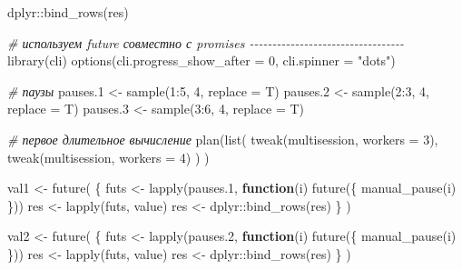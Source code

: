 \documentclass[
]{book}
\newenvironment{Shaded}{\begin{snugshade}}{\end{snugshade}}
\newcommand{\AttributeTok}[1]{\textcolor[rgb]{0.77,0.63,0.00}{#1}}
\newcommand{\CommentTok}[1]{\textcolor[rgb]{0.56,0.35,0.01}{\textit{#1}}}
\newcommand{\ControlFlowTok}[1]{\textcolor[rgb]{0.13,0.29,0.53}{\textbf{#1}}}
\newcommand{\DecValTok}[1]{\textcolor[rgb]{0.00,0.00,0.81}{#1}}
\newcommand{\FloatTok}[1]{\textcolor[rgb]{0.00,0.00,0.81}{#1}}
\newcommand{\FunctionTok}[1]{\textcolor[rgb]{0.00,0.00,0.00}{#1}}
\newcommand{\NormalTok}[1]{#1}
\newcommand{\OtherTok}[1]{\textcolor[rgb]{0.56,0.35,0.01}{#1}}
\newcommand{\SpecialCharTok}[1]{\textcolor[rgb]{0.00,0.00,0.00}{#1}}
\newcommand{\StringTok}[1]{\textcolor[rgb]{0.31,0.60,0.02}{#1}}
\begin{document}
\begin{Shaded}
\begin{Highlighting}[]
\NormalTok{dplyr}\SpecialCharTok{::}\FunctionTok{bind\_rows}\NormalTok{(res)}


\CommentTok{\# используем future совместно с promises {-}{-}{-}{-}{-}{-}{-}{-}{-}{-}{-}{-}{-}{-}{-}{-}{-}{-}{-}{-}{-}{-}{-}{-}{-}{-}{-}{-}{-}{-}{-}{-}{-}{-}}
\FunctionTok{library}\NormalTok{(cli)}
\FunctionTok{options}\NormalTok{(}\AttributeTok{cli.progress\_show\_after =} \DecValTok{0}\NormalTok{, }
        \AttributeTok{cli.spinner =} \StringTok{"dots"}\NormalTok{)}

\CommentTok{\# паузы}
\NormalTok{pauses}\FloatTok{.1} \OtherTok{\textless{}{-}} \FunctionTok{sample}\NormalTok{(}\DecValTok{1}\SpecialCharTok{:}\DecValTok{5}\NormalTok{, }\DecValTok{4}\NormalTok{, }\AttributeTok{replace =}\NormalTok{ T)}
\NormalTok{pauses}\FloatTok{.2} \OtherTok{\textless{}{-}} \FunctionTok{sample}\NormalTok{(}\DecValTok{2}\SpecialCharTok{:}\DecValTok{3}\NormalTok{, }\DecValTok{4}\NormalTok{, }\AttributeTok{replace =}\NormalTok{ T)}
\NormalTok{pauses}\FloatTok{.3} \OtherTok{\textless{}{-}} \FunctionTok{sample}\NormalTok{(}\DecValTok{3}\SpecialCharTok{:}\DecValTok{6}\NormalTok{, }\DecValTok{4}\NormalTok{, }\AttributeTok{replace =}\NormalTok{ T)}

\CommentTok{\# первое длительное вычисление}
\FunctionTok{plan}\NormalTok{(}\FunctionTok{list}\NormalTok{(}
  \FunctionTok{tweak}\NormalTok{(multisession, }\AttributeTok{workers =} \DecValTok{3}\NormalTok{), }
  \FunctionTok{tweak}\NormalTok{(multisession, }\AttributeTok{workers =} \DecValTok{4}\NormalTok{)}
\NormalTok{  )}
\NormalTok{)}

\NormalTok{val1 }\OtherTok{\textless{}{-}} \FunctionTok{future}\NormalTok{(}
\NormalTok{  \{}
\NormalTok{    futs }\OtherTok{\textless{}{-}} \FunctionTok{lapply}\NormalTok{(pauses}\FloatTok{.1}\NormalTok{, }\ControlFlowTok{function}\NormalTok{(i) }\FunctionTok{future}\NormalTok{(\{ }\FunctionTok{manual\_pause}\NormalTok{(i) \}))}
\NormalTok{    res  }\OtherTok{\textless{}{-}} \FunctionTok{lapply}\NormalTok{(futs, value) }
\NormalTok{    res  }\OtherTok{\textless{}{-}}\NormalTok{ dplyr}\SpecialCharTok{::}\FunctionTok{bind\_rows}\NormalTok{(res)}
\NormalTok{  \}}
\NormalTok{) }

\NormalTok{val2 }\OtherTok{\textless{}{-}} \FunctionTok{future}\NormalTok{(}
\NormalTok{  \{}
\NormalTok{    futs }\OtherTok{\textless{}{-}} \FunctionTok{lapply}\NormalTok{(pauses}\FloatTok{.2}\NormalTok{, }\ControlFlowTok{function}\NormalTok{(i) }\FunctionTok{future}\NormalTok{(\{ }\FunctionTok{manual\_pause}\NormalTok{(i) \}))}
\NormalTok{    res  }\OtherTok{\textless{}{-}} \FunctionTok{lapply}\NormalTok{(futs, value) }
\NormalTok{    res  }\OtherTok{\textless{}{-}}\NormalTok{ dplyr}\SpecialCharTok{::}\FunctionTok{bind\_rows}\NormalTok{(res)}
\NormalTok{  \}}
\NormalTok{) }


\end{Highlighting}
\end{Shaded}
\end{document}
